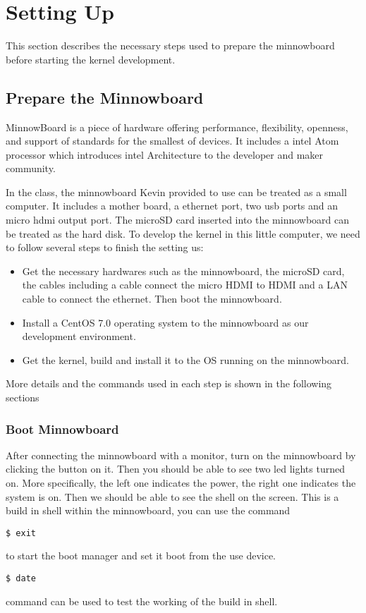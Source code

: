 \documentclass[letterpaper,10pt,onecolumn]{IEEEtran}
\begin{document}
\section{Setting Up }
This section describes the necessary steps used to prepare the minnowboard before starting the kernel development.
\subsection{Prepare the Minnowboard}
MinnowBoard is a piece of hardware offering performance, flexibility, openness, and support of standards for the smallest of devices. It includes a intel Atom processor which introduces intel Architecture to the developer and maker community.

In the class, the minnowboard Kevin provided to use can be treated as a small computer. It includes a mother board, a ethernet port, two usb ports and an micro hdmi output port. The microSD card inserted into the minnowboard can be treated as the hard disk. To develop the kernel in this little computer, we need to follow several steps to finish the setting us:
\begin{itemize}
  \item Get the necessary hardwares such as the minnowboard, the microSD card, the cables including a cable connect the micro HDMI to HDMI and a LAN cable to connect the ethernet. Then boot the minnowboard.
  \item Install a CentOS 7.0 operating system to the minnowboard as our development environment.
  \item Get the kernel, build and install it to the OS running on the minnowboard.
\end{itemize}
More details and the commands used in each step is shown in the following sections
\subsubsection{Boot Minnowboard}
After connecting the minnowboard with a monitor, turn on the minnowboard by clicking the button on it. Then you should be able to see two led lights turned on. More specifically, the left one indicates the power, the right one indicates the system is on. Then we should be able to see the shell on the screen. This is a build in shell within the minnowboard, you can use the command
\begin{verbatim}
$ exit
\end{verbatim}
to start the boot manager and set it boot from the use device.
\begin{verbatim}
$ date
\end{verbatim}
command can be used to test the working of the build in shell.
\end{document}
